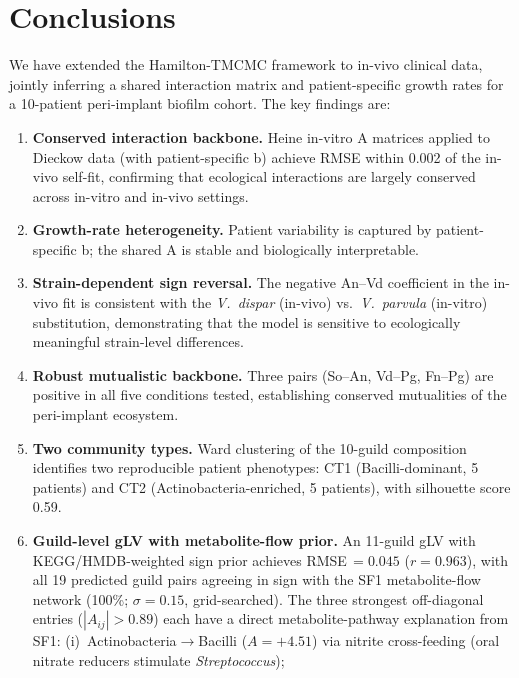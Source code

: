 \documentclass[11pt,a4paper]{article}
\begin{document}
\section{Conclusions}
\label{sec:conclusions}

We have extended the Hamilton-TMCMC framework to in-vivo clinical data, jointly inferring a shared interaction matrix and patient-specific growth rates for a 10-patient peri-implant biofilm cohort.
The key findings are:
\begin{enumerate}[nosep,leftmargin=*]
\item \textbf{Conserved interaction backbone.} Heine in-vitro A matrices applied to Dieckow data (with patient-specific b) achieve RMSE within 0.002 of the in-vivo self-fit, confirming that ecological interactions are largely conserved across in-vitro and in-vivo settings.
\item \textbf{Growth-rate heterogeneity.} Patient variability is captured by patient-specific b; the shared A is stable and biologically interpretable.
\item \textbf{Strain-dependent sign reversal.} The negative An--Vd coefficient in the in-vivo fit is consistent with the \textit{V.~dispar} (in-vivo) vs.\ \textit{V.~parvula} (in-vitro) substitution, demonstrating that the model is sensitive to ecologically meaningful strain-level differences.
\item \textbf{Robust mutualistic backbone.} Three pairs (So--An, Vd--Pg, Fn--Pg) are positive in all five conditions tested, establishing conserved mutualities of the peri-implant ecosystem.
\item \textbf{Two community types.} Ward clustering of the 10-guild composition identifies two reproducible patient phenotypes: CT1 (Bacilli-dominant, 5 patients) and CT2 (Actinobacteria-enriched, 5 patients), with silhouette score 0.59.
\item \textbf{Guild-level gLV with metabolite-flow prior.}
An 11-guild gLV with KEGG/HMDB-weighted sign prior achieves RMSE\,$=0.045$ ($r=0.963$), with all 19 predicted guild pairs agreeing in sign with the SF1 metabolite-flow network (100\%; $\sigma=0.15$, grid-searched).
The three strongest off-diagonal entries ($|A_{ij}|>0.89$) each have a direct metabolite-pathway explanation from SF1:
(i)~Actinobacteria$\to$Bacilli ($A=+4.51$) via nitrite cross-feeding (oral nitrate reducers stimulate \textit{Streptococcus});

\end{enumerate}
\end{document}
